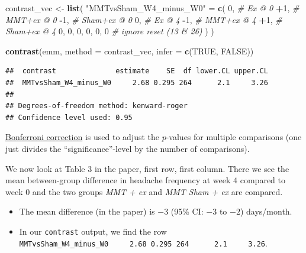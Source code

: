\documentclass[
]{book}
\newenvironment{Shaded}{\begin{snugshade}}{\end{snugshade}}
\newcommand{\AttributeTok}[1]{\textcolor[rgb]{0.13,0.29,0.53}{#1}}
\newcommand{\CommentTok}[1]{\textcolor[rgb]{0.56,0.35,0.01}{\textit{#1}}}
\newcommand{\ConstantTok}[1]{\textcolor[rgb]{0.56,0.35,0.01}{#1}}
\newcommand{\DecValTok}[1]{\textcolor[rgb]{0.00,0.00,0.81}{#1}}
\newcommand{\FunctionTok}[1]{\textcolor[rgb]{0.13,0.29,0.53}{\textbf{#1}}}
\newcommand{\NormalTok}[1]{#1}
\newcommand{\OtherTok}[1]{\textcolor[rgb]{0.56,0.35,0.01}{#1}}
\newcommand{\SpecialCharTok}[1]{\textcolor[rgb]{0.81,0.36,0.00}{\textbf{#1}}}
\newcommand{\StringTok}[1]{\textcolor[rgb]{0.31,0.60,0.02}{#1}}
\providecommand{\tightlist}{%
  \setlength{\itemsep}{0pt}\setlength{\parskip}{0pt}}
\begin{document}
\begin{Shaded}
\begin{Highlighting}[]
\NormalTok{contrast\_vec }\OtherTok{\textless{}{-}} \FunctionTok{list}\NormalTok{(}
  \StringTok{"MMTvsSham\_W4\_minus\_W0"} \OtherTok{=} \FunctionTok{c}\NormalTok{(}
    \DecValTok{0}\NormalTok{,   }\CommentTok{\# Ex @ 0}
    \SpecialCharTok{+}\DecValTok{1}\NormalTok{,  }\CommentTok{\# MMT+ex @ 0}
    \SpecialCharTok{{-}}\DecValTok{1}\NormalTok{,  }\CommentTok{\# Sham+ex @ 0}
    \DecValTok{0}\NormalTok{,   }\CommentTok{\# Ex @ 4}
    \SpecialCharTok{{-}}\DecValTok{1}\NormalTok{,  }\CommentTok{\# MMT+ex @ 4}
    \SpecialCharTok{+}\DecValTok{1}\NormalTok{,  }\CommentTok{\# Sham+ex @ 4}
    \DecValTok{0}\NormalTok{, }\DecValTok{0}\NormalTok{, }\DecValTok{0}\NormalTok{, }\DecValTok{0}\NormalTok{, }\DecValTok{0}\NormalTok{, }\DecValTok{0} \CommentTok{\# ignore reset (13 \& 26)}
\NormalTok{  )}
\NormalTok{)}

\FunctionTok{contrast}\NormalTok{(emm, }\AttributeTok{method =}\NormalTok{ contrast\_vec, }\AttributeTok{infer =} \FunctionTok{c}\NormalTok{(}\ConstantTok{TRUE}\NormalTok{, }\ConstantTok{FALSE}\NormalTok{))}
\end{Highlighting}
\end{Shaded}

\begin{verbatim}
##  contrast              estimate    SE  df lower.CL upper.CL
##  MMTvsSham_W4_minus_W0     2.68 0.295 264      2.1     3.26
## 
## Degrees-of-freedom method: kenward-roger 
## Confidence level used: 0.95
\end{verbatim}

\href{https://en.wikipedia.org/wiki/Bonferroni_correction}{Bonferroni correction}
is used to adjust the \(p\)-values for multiple comparisons
(one just divides the ``significance''-level by the number of comparisons).

We now look at Table 3 in the paper, first row, first column.
There we see the mean between-group difference in headache frequency
at week \(4\) compared to week \(0\) and the two groups \emph{MMT + ex} and \emph{MMT Sham + ex}
are compared.

\begin{itemize}
\tightlist
\item
  The mean difference (in the paper) is \(-3\) (95\% CI: \(-3\) to \(-2\)) days/month.
\item
  In our \texttt{contrast} output, we find the row
  \texttt{MMTvsSham\_W4\_minus\_W0\ \ \ \ \ 2.68\ 0.295\ 264\ \ \ \ \ \ 2.1\ \ \ \ \ 3.26}.
\end{itemize}
\end{document}
